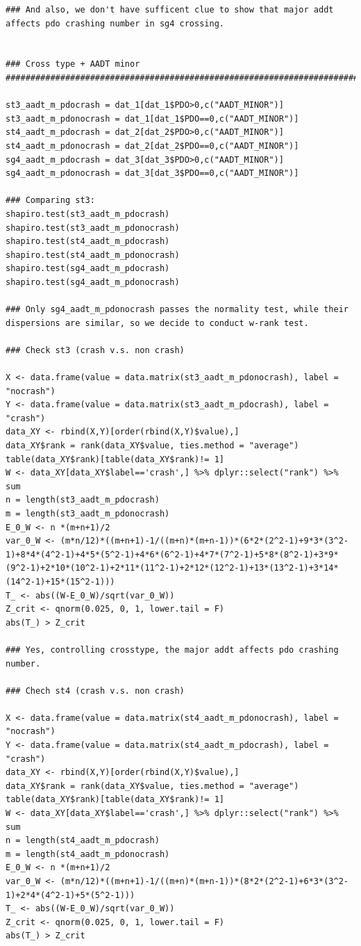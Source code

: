 \documentclass[11pt]{scrartcl} %
\begin{document}
\begin{lstlisting}
### And also, we don't have sufficent clue to show that major addt affects pdo crashing number in sg4 crossing.


### Cross type + AADT minor
########################################################################################################################################

st3_aadt_m_pdocrash = dat_1[dat_1$PDO>0,c("AADT_MINOR")]
st3_aadt_m_pdonocrash = dat_1[dat_1$PDO==0,c("AADT_MINOR")]
st4_aadt_m_pdocrash = dat_2[dat_2$PDO>0,c("AADT_MINOR")]
st4_aadt_m_pdonocrash = dat_2[dat_2$PDO==0,c("AADT_MINOR")]
sg4_aadt_m_pdocrash = dat_3[dat_3$PDO>0,c("AADT_MINOR")]
sg4_aadt_m_pdonocrash = dat_3[dat_3$PDO==0,c("AADT_MINOR")]

### Comparing st3:
shapiro.test(st3_aadt_m_pdocrash)
shapiro.test(st3_aadt_m_pdonocrash)
shapiro.test(st4_aadt_m_pdocrash)
shapiro.test(st4_aadt_m_pdonocrash)
shapiro.test(sg4_aadt_m_pdocrash)
shapiro.test(sg4_aadt_m_pdonocrash)

### Only sg4_aadt_m_pdonocrash passes the normality test, while their dispersions are similar, so we decide to conduct w-rank test.

### Check st3 (crash v.s. non crash)

X <- data.frame(value = data.matrix(st3_aadt_m_pdonocrash), label = "nocrash")
Y <- data.frame(value = data.matrix(st3_aadt_m_pdocrash), label = "crash")
data_XY <- rbind(X,Y)[order(rbind(X,Y)$value),]
data_XY$rank = rank(data_XY$value, ties.method = "average")
table(data_XY$rank)[table(data_XY$rank)!= 1]
W <- data_XY[data_XY$label=='crash',] %>% dplyr::select("rank") %>% sum
n = length(st3_aadt_m_pdocrash)
m = length(st3_aadt_m_pdonocrash)
E_0_W <- n *(m+n+1)/2
var_0_W <- (m*n/12)*((m+n+1)-1/((m+n)*(m+n-1))*(6*2*(2^2-1)+9*3*(3^2-1)+8*4*(4^2-1)+4*5*(5^2-1)+4*6*(6^2-1)+4*7*(7^2-1)+5*8*(8^2-1)+3*9*(9^2-1)+2*10*(10^2-1)+2*11*(11^2-1)+2*12*(12^2-1)+13*(13^2-1)+3*14*(14^2-1)+15*(15^2-1)))
T_ <- abs((W-E_0_W)/sqrt(var_0_W))
Z_crit <- qnorm(0.025, 0, 1, lower.tail = F)
abs(T_) > Z_crit

### Yes, controlling crosstype, the major addt affects pdo crashing number.

### Chech st4 (crash v.s. non crash)

X <- data.frame(value = data.matrix(st4_aadt_m_pdonocrash), label = "nocrash")
Y <- data.frame(value = data.matrix(st4_aadt_m_pdocrash), label = "crash")
data_XY <- rbind(X,Y)[order(rbind(X,Y)$value),]
data_XY$rank = rank(data_XY$value, ties.method = "average")
table(data_XY$rank)[table(data_XY$rank)!= 1]
W <- data_XY[data_XY$label=='crash',] %>% dplyr::select("rank") %>% sum
n = length(st4_aadt_m_pdocrash)
m = length(st4_aadt_m_pdonocrash)
E_0_W <- n *(m+n+1)/2
var_0_W <- (m*n/12)*((m+n+1)-1/((m+n)*(m+n-1))*(8*2*(2^2-1)+6*3*(3^2-1)+2*4*(4^2-1)+5*(5^2-1)))
T_ <- abs((W-E_0_W)/sqrt(var_0_W))
Z_crit <- qnorm(0.025, 0, 1, lower.tail = F)
abs(T_) > Z_crit


\end{lstlisting}
\end{document}
